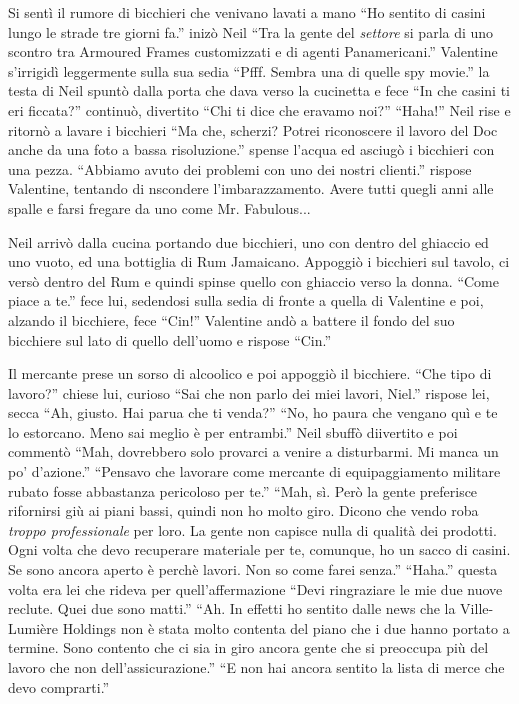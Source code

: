     Si sentì il rumore di bicchieri che venivano lavati a mano ``Ho sentito di casini lungo le strade tre giorni fa.''
    inizò Neil ``Tra la gente del \emph{settore} si parla di uno scontro tra Armoured Frames customizzati e di agenti
    Panamericani.'' Valentine s'irrigidì leggermente sulla sua sedia ``Pfff. Sembra una di quelle spy movie.'' la testa
    di Neil spuntò dalla porta che dava verso la cucinetta e fece ``In che casini ti eri ficcata?'' continuò, divertito
    ``Chi ti dice che eravamo noi?'' ``Haha!'' Neil rise e ritornò a lavare i bicchieri ``Ma che, scherzi? Potrei
    riconoscere il lavoro del Doc anche da una foto a bassa risoluzione.'' spense l'acqua ed asciugò i bicchieri con una
    pezza. ``Abbiamo avuto dei problemi con uno dei nostri clienti.'' rispose Valentine, tentando di nscondere
    l'imbarazzamento. Avere tutti quegli anni alle spalle e farsi fregare da uno come Mr. Fabulous...

    Neil arrivò dalla cucina portando due bicchieri, uno con dentro del ghiaccio ed uno vuoto, ed una bottiglia di Rum
    Jamaicano. Appoggiò i bicchieri sul tavolo, ci versò dentro del Rum e quindi spinse quello con ghiaccio verso la
    donna. ``Come piace a te.'' fece lui, sedendosi sulla sedia di fronte a quella di Valentine e poi, alzando il
    bicchiere, fece ``Cin!'' Valentine andò a battere il fondo del suo bicchiere sul lato di quello dell'uomo e rispose
    ``Cin.''

    Il mercante prese un sorso di alcoolico e poi appoggiò il bicchiere. ``Che tipo di lavoro?'' chiese lui, curioso
    ``Sai che non parlo dei miei lavori, Niel.'' rispose lei, secca ``Ah, giusto. Hai parua che ti venda?'' ``No, ho
    paura che vengano quì e te lo estorcano. Meno sai meglio è per entrambi.'' Neil sbuffò diivertito e poi commentò
    ``Mah, dovrebbero solo provarci a venire a disturbarmi. Mi manca un po' d'azione.'' ``Pensavo che lavorare come
    mercante di equipaggiamento militare rubato fosse abbastanza pericoloso per te.'' ``Mah, sì. Però la gente
    preferisce rifornirsi giù ai piani bassi, quindi non ho molto giro. Dicono che vendo roba \emph{troppo professionale} per
    loro. La gente non capisce nulla di qualità dei prodotti. Ogni volta che devo recuperare materiale per te,
    comunque, ho un sacco di casini. Se sono ancora aperto è perchè lavori. Non so come farei senza.'' ``Haha.'' questa
    volta era lei che rideva per quell'affermazione ``Devi ringraziare le mie due nuove reclute. Quei due sono matti.'' ``Ah. In
    effetti ho sentito dalle news che la Ville-Lumière Holdings non è stata molto contenta del piano che i due hanno
    portato a termine. Sono contento che ci sia in giro ancora gente che si preoccupa più del lavoro che non
    dell'assicurazione.'' ``E non hai ancora sentito la lista di merce che devo comprarti.''

